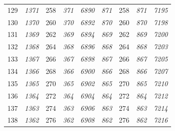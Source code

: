 \documentclass[10pt,fleqn]{article}
\begin{document}
\begin{longtable}{c|cccccccc}
129 & {\color{blue} \it 1371 \rm} & {\color{black} 258} & {\color{blue} \it 371 \rm} & {\color{blue} \it 6890 \rm} & {\color{blue} \it 871 \rm} & {\color{black} 258} & {\color{blue} \it 871 \rm} & {\color{blue} \it 7195 \rm} \\
130 & {\color{blue} \it 1370 \rm} & {\color{black} 260} & {\color{blue} \it 370 \rm} & {\color{blue} \it 6892 \rm} & {\color{blue} \it 870 \rm} & {\color{black} 260} & {\color{blue} \it 870 \rm} & {\color{blue} \it 7198 \rm} \\
131 & {\color{blue} \it 1369 \rm} & {\color{black} 262} & {\color{blue} \it 369 \rm} & {\color{blue} \it 6894 \rm} & {\color{blue} \it 869 \rm} & {\color{black} 262} & {\color{blue} \it 869 \rm} & {\color{blue} \it 7200 \rm} \\
132 & {\color{blue} \it 1368 \rm} & {\color{black} 264} & {\color{blue} \it 368 \rm} & {\color{blue} \it 6896 \rm} & {\color{blue} \it 868 \rm} & {\color{black} 264} & {\color{blue} \it 868 \rm} & {\color{blue} \it 7203 \rm} \\
133 & {\color{blue} \it 1367 \rm} & {\color{black} 266} & {\color{blue} \it 367 \rm} & {\color{blue} \it 6898 \rm} & {\color{blue} \it 867 \rm} & {\color{black} 266} & {\color{blue} \it 867 \rm} & {\color{blue} \it 7205 \rm} \\
134 & {\color{blue} \it 1366 \rm} & {\color{black} 268} & {\color{blue} \it 366 \rm} & {\color{blue} \it 6900 \rm} & {\color{blue} \it 866 \rm} & {\color{black} 268} & {\color{blue} \it 866 \rm} & {\color{blue} \it 7207 \rm} \\
135 & {\color{blue} \it 1365 \rm} & {\color{black} 270} & {\color{blue} \it 365 \rm} & {\color{blue} \it 6902 \rm} & {\color{blue} \it 865 \rm} & {\color{black} 270} & {\color{blue} \it 865 \rm} & {\color{blue} \it 7210 \rm} \\
136 & {\color{blue} \it 1364 \rm} & {\color{black} 272} & {\color{blue} \it 364 \rm} & {\color{blue} \it 6904 \rm} & {\color{blue} \it 864 \rm} & {\color{black} 272} & {\color{blue} \it 864 \rm} & {\color{blue} \it 7212 \rm} \\
137 & {\color{blue} \it 1363 \rm} & {\color{black} 274} & {\color{blue} \it 363 \rm} & {\color{blue} \it 6906 \rm} & {\color{blue} \it 863 \rm} & {\color{black} 274} & {\color{blue} \it 863 \rm} & {\color{blue} \it 7214 \rm} \\
138 & {\color{blue} \it 1362 \rm} & {\color{black} 276} & {\color{blue} \it 362 \rm} & {\color{blue} \it 6908 \rm} & {\color{blue} \it 862 \rm} & {\color{black} 276} & {\color{blue} \it 862 \rm} & {\color{blue} \it 7216 \rm} \\

\end{longtable}
\end{document}

